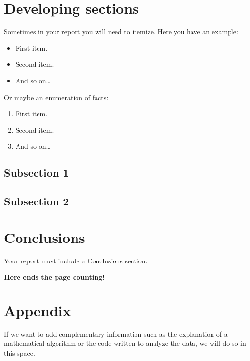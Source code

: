 \documentclass[aps,pra,twocolumn,10pt,floatfix]{revtex4-2}
\begin{document}
\section{Developing sections}

Sometimes in your report you will need to itemize. Here you have an example:
%
\begin{itemize}
	\item First item.
	\item Second item.
	\item And so on\dots
\end{itemize}
%
Or maybe an enumeration of facts:
%
\begin{enumerate}
	\item First item.
	\item Second item.
	\item And so on\dots
\end{enumerate}

\lipsum[1-2] %


\subsection{Subsection 1}

\lipsum[5-6]

\subsection{Subsection 2}

\lipsum[7-9]



\section{Conclusions}

Your report must include a Conclusions section.

\textbf{Here ends the page counting!}
\\

\section*{Appendix}

If we want to add complementary information such as the explanation of a mathematical algorithm or the code written to analyze the data, we will do so in this space.
\end{document}

